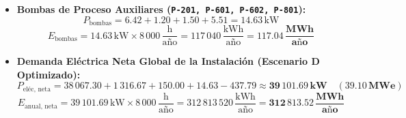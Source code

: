\documentclass[10pt,letterpaper]{article}
\begin{document}
\begin{itemize}
    \item \textbf{Bombas de Proceso Auxiliares (\texttt{P-201, P-601, P-602, P-801}):}
    \begin{equation}
    P_{\text{bombas}} = 6.42 + 1.20 + 1.50 + 5.51 = 14.63\,\text{kW}
    \end{equation}
    \begin{equation}
    E_{\text{bombas}} = 14.63\,\text{kW} \times 8\,000\,\frac{\text{h}}{\text{año}} = 117\,040\,\frac{\text{kWh}}{\text{año}} = \mathbf{117.04\,\frac{\text{MWh}}{\text{año}}}
    \end{equation}
    \item \textbf{Demanda Eléctrica Neta Global de la Instalación (Escenario D Optimizado):}
    \begin{equation}
    P_{\text{eléc, neta}} = 38\,067.30 + 1\,316.67 + 150.00 + 14.63 - 437.79 \approx \mathbf{39\,101.69\,\text{kW}} \quad (\mathbf{39.10\,\text{MWe}})
    \end{equation}
    \begin{equation}
    E_{\text{anual, neta}} = 39\,101.69\,\text{kW} \times 8\,000\,\frac{\text{h}}{\text{año}} = 312\,813\,520\,\frac{\text{kWh}}{\text{año}} = \mathbf{312\,813.52\,\frac{\text{MWh}}{\text{año}}}
    \end{equation}
\end{itemize}
\end{document}
